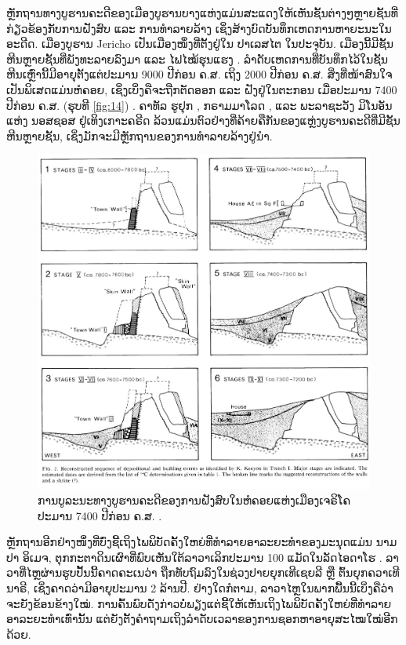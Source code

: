 \documentclass[10pt,twocolumn,letterpaper]{article}
\begin{document}
ຫຼັກຖານທາງບູຮານຄະດີຂອງເມືອງບູຮານບາງແຫ່ງແມ່ນສະແດງໃຫ້ເຫັນຊັ້ນຕ່າງໆຫຼາຍຊັ້ນທີ່ກ່ຽວຂ້ອງກັບການຝັງສົບ ແລະ ການທຳລາຍລ້າງ ເຊິ່ງສ້າງບົດບັນທຶກເຫດການຫາຍະນະໃນອະດີດ. ເມືອງບູຮານ Jericho ເປັນເມືອງໜຶ່ງທີ່ຕັ້ງຢູ່ໃນ ປາເລສໄຕ ໃນປະຈຸບັນ. ເມືອງນີ້ມີຊັ້ນຫີນຫຼາຍຊັ້ນທີ່ພັງທະລາຍລົງມາ ແລະ ໄຟໄໝ້ຮຸນແຮງ \cite{96,97}. ລຳດັບເຫດການທີ່ບັນທຶກໄວ້ໃນຊັ້ນຫີນເຫຼົ່ານີ້ມີອາຍຸຕັ້ງແຕ່ປະມານ 9000 ປີກ່ອນ ຄ.ສ. ເຖິງ 2000 ປີກ່ອນ ຄ.ສ. ສິ່ງທີ່ໜ້າສົນໃຈເປັນພິເສດແມ່ນຫໍຄອຍ, ເຊິ່ງເບິ່ງຄືຈະຖືກຕັດອອກ ແລະ ຝັງຢູ່ໃນຕະກອນ ເມື່ອປະມານ 7400 ປີກ່ອນ ຄ.ສ. (ຮຸບທີ \ref{fig:14}) \cite{95}. ຄາທັລ ຮູຢຸກ \cite{99}, ກຣາມມາໂລດ \cite{98}, ແລະ ພະລາຊະວັງ ມິໂນອັນ ແຫ່ງ ນອສຊອສ ຢູ່ເທິງເກາະຄຣີດ \cite{100,101} ລ້ວນແມ່ນຕົວຢ່າງທີ່ຄ້າຍຄືກັນຂອງແຫຼ່ງບູຮານຄະດີທີ່ມີຊັ້ນຫີນຫຼາຍຊັ້ນ, ເຊິ່ງມັກຈະມີຫຼັກຖານຂອງການທຳລາຍລ້າງຢູ່ນຳ.

\begin{figure}[t]
\begin{center}
   \includegraphics[width=1\linewidth]{jericho.jpg}
\end{center}
   \caption{ການບູລະນະທາງບູຮານຄະດີຂອງການຝັງສົບໃນຫໍຄອຍແຫ່ງເມືອງເຈຣິໂຄ ປະມານ 7400 ປີກ່ອນ ຄ.ສ. \cite{95}.}
\label{fig:14}
\label{fig:onecol}
\end{figure}

ຫຼັກຖານອີກຢ່າງໜຶ່ງທີ່ບົ່ງຊີ້ເຖິງໄພພິບັດຄັ້ງໃຫຍ່ທີ່ທຳລາຍອາລະຍະທຳຂອງມະນຸດແມ່ນ ນາມປາ ອິເມຈ, ຕຸກກະຕາດິນເຜົາທີ່ພົບເຫັນໃຕ້ລາວາເລິກປະມານ 100 ແມັດໃນລັດໄອດາໂຮ \cite{102,103}. ລາວາທີ່ໄຫຼຜ່ານຮູບປັ້ນນີ້ຄາດຄະເນວ່າ ຖືກທັບຖົມລົງໃນຊ່ວງປາຍຍຸກເທີເຊຍລີ ຫຼື ຕົ້ນຍຸກຄວາເທີນາຣີ, ເຊິ່ງຄາດວ່າມີອາຍຸປະມານ 2 ລ້ານປີ. ຢ່າງໃດກໍຕາມ, ລາວາໄຫຼໃນພາກພື້ນນີ້ເບິ່ງຄືວ່າຈະຍັງຂ້ອນຂ້າງໃໝ່. ການຄົ້ນພົບດັ່ງກ່າວບໍ່ພຽງແຕ່ຊີ້ໃຫ້ເຫັນເຖິງໄພພິບັດຄັ້ງໃຫຍ່ທີ່ທຳລາຍອາລະຍະທຳເທົ່ານັ້ນ ແຕ່ຍັງຕັ້ງຄຳຖາມເຖິງລຳດັບເວລາຂອງການຊອກຫາອາຍຸສະໄໝໃໝ່ອີກດ້ວຍ.
\end{document}
